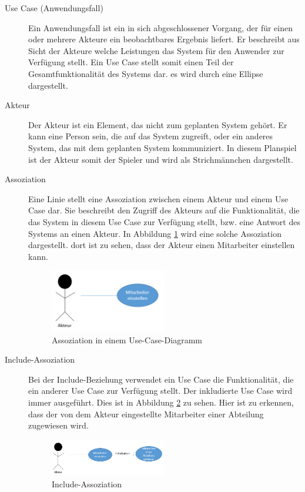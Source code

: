 \begin{description}
\item[Use Case (Anwendungsfall)]
 Ein Anwendungsfall ist ein in sich abgeschlossener Vorgang, der für einen oder mehrere Akteure ein beobachtbares Ergebnis liefert. Er beschreibt aus Sicht der Akteure welche Leistungen das System für den Anwender zur Verfügung stellt. Ein Use Case stellt somit einen Teil der Gesamtfunktionalität des Systems dar. es wird durch eine Ellipse dargestellt. 

\item[Akteur]
Der Akteur ist ein Element, das nicht zum geplanten System gehört. Er kann eine Person sein, die auf das System zugreift, oder ein anderes System, das mit dem geplanten System kommuniziert. In diesem Planspiel ist der Akteur somit der Spieler und wird als Strichmännchen dargestellt.

\item[Assoziation]
Eine Linie stellt eine Assoziation zwischen einem Akteur und einem Use Case dar. Sie beschreibt den Zugriff des Akteurs auf die Funktionalität, die das System in diesem Use Case zur Verfü­gung stellt, bzw. eine Antwort des Systems an einen Akteur. In Abbildung \ref{abb:use_case_assoziation} wird eine solche Assoziation dargestellt. dort ist zu sehen, dass der Akteur einen Mitarbeiter einstellen kann.
\begin{figure}[h]
	\centering	\includegraphics[width=0.5\textwidth]{img/programmentwurf/use_case_assoziation}
	\captionsetup{format=hang}
	\caption{
		\label{abb:use_case_assoziation}Assoziation in einem Use-Case-Diagramm}
\end{figure}

\item[Include-Assoziation]
Bei der Include-Beziehung verwendet ein Use Case die Funktionalität, die ein anderer Use Case zur Verfügung stellt. Der inkludierte Use Case wird immer ausgeführt. Dies ist in Abbildung \ref{abb:use_case_include} zu sehen. Hier ist zu erkennen, dass der von dem Akteur eingestellte Mitarbeiter einer Abteilung zugewiesen wird.



\begin{figure}[h]
	\centering	\includegraphics[width=0.5\textwidth]{img/programmentwurf/use_case_include}
	\captionsetup{format=hang}
	\caption{
		\label{abb:use_case_include}Include-Assoziation}
\end{figure}


\end{description}
